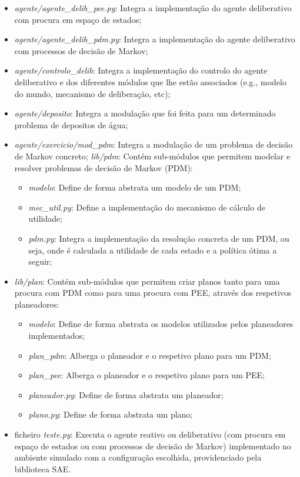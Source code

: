 \begin{itemize}
    \item \textit{agente/agente\_delib\_pee.py}: Integra a implementação do agente deliberativo com procura em espaço de estados;
    \item \textit{agente/agente\_delib\_pdm.py}: Integra a implementação do agente deliberativo com processos de decisão de Markov;
    \item \textit{agente/controlo\_delib}: Integra a implementação do controlo do agente deliberativo e dos diferentes módulos que lhe estão associados (e.g., modelo do mundo, mecanismo de deliberação, etc);
    \item \textit{agente/deposito}: Integra a modulação que foi feita para um determinado problema de depositos de água;
    \item \textit{agente/exercicio/mod\_pdm}: Integra a modulação de um problema de decisão de Markov concreto;
    \textit{lib/pdm}: Contém sub-módulos que permitem modelar e resolver problemas de decisão de Markov (PDM):
    \begin{itemize}
        \item \textit{modelo}: Define de forma abstrata um modelo de um PDM;
        \item \textit{mec\_util.py}: Define a implementação do mecanismo de cálculo de utilidade;
        \item \textit{pdm.py}: Integra a implementação da resolução concreta de um PDM, ou seja, onde é calculada a utilidade de cada estado e a política ótima a seguir;
    \end{itemize}
    \item \textit{lib/plan}: Contém sub-módulos que permitem criar planos tanto para uma procura com PDM como para uma procura com PEE, através dos respetivos planeadores:
    \begin{itemize}
        \item \textit{modelo}: Define de forma abstrata os modelos utilizados pelos planeadores implementados;
        \item \textit{plan\_pdm}: Alberga o planeador e o respetivo plano para um PDM;
        \item \textit{plan\_pee}: Alberga o planeador e o respetivo plano para um PEE;
        \item \textit{planeador.py}: Define de forma abstrata um planeador;
        \item \textit{plano.py}: Define de forma abstrata um plano;
    \end{itemize}
    \item ficheiro \textit{teste.py}: Executa o agente reativo ou deliberativo (com procura em espaço de estados ou com processos de decisão de Markov) implementado no ambiente simulado com a configuração escolhida, providenciado pela biblioteca SAE.
\end{itemize}
